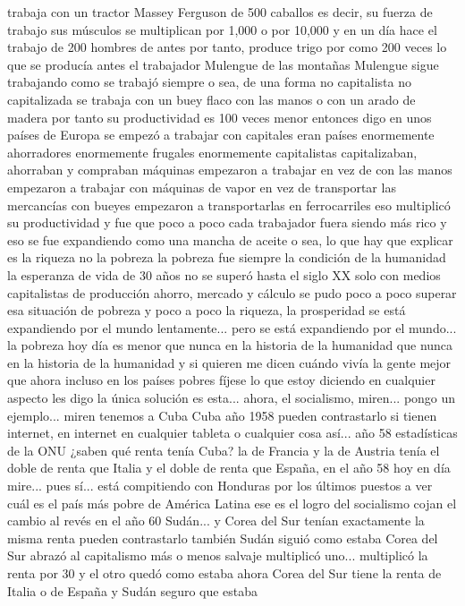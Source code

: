trabaja con un tractor Massey Ferguson de 500 caballos es decir, su fuerza de trabajo
sus músculos se multiplican por 1,000 o por 10,000 y en un día hace el trabajo de 200 hombres de antes
por tanto, produce trigo por como 200 veces lo que se producía antes el trabajador Mulengue de las montañas Mulengue
sigue trabajando como se trabajó siempre o sea, de una forma no capitalista no capitalizada se trabaja con un buey flaco
con las manos o con un arado de madera por tanto su productividad es 100 veces menor entonces digo
en unos países de Europa se empezó a trabajar con capitales eran países enormemente ahorradores enormemente frugales
enormemente capitalistas capitalizaban, ahorraban y compraban máquinas empezaron a trabajar en vez de con las manos
empezaron a trabajar con máquinas de vapor en vez de transportar las mercancías con bueyes empezaron a transportarlas en ferrocarriles
eso multiplicó su productividad y fue que poco a poco cada trabajador fuera siendo más rico
y eso se fue expandiendo como una mancha de aceite o sea, lo que hay que explicar es la riqueza
no la pobreza la pobreza fue siempre la condición de la humanidad la esperanza de vida de 30 años
no se superó hasta el siglo XX solo con medios capitalistas de producción
ahorro, mercado y cálculo se pudo poco a poco superar esa situación de pobreza
y poco a poco la riqueza, la prosperidad se está expandiendo por el mundo lentamente... pero se está expandiendo por el mundo...
la pobreza hoy día es menor que nunca en la historia de la humanidad que nunca en la historia de la humanidad y si quieren me dicen cuándo vivía la gente mejor que ahora
incluso en los países pobres fíjese lo que estoy diciendo en cualquier aspecto les digo la única solución es esta...
ahora, el socialismo, miren... pongo un ejemplo... miren tenemos a Cuba Cuba año 1958
pueden contrastarlo si tienen internet, en internet en cualquier tableta o cualquier cosa así... año 58 estadísticas de la ONU
¿saben qué renta tenía Cuba? la de Francia y la de Austria
tenía el doble de renta que Italia y el doble de renta que España, en el año 58 hoy en día mire... pues sí...
está compitiendo con Honduras por los últimos puestos a ver cuál es el país más pobre de América Latina ese es el logro del socialismo
cojan el cambio al revés en el año 60 Sudán... y Corea del Sur
tenían exactamente la misma renta pueden contrastarlo también
Sudán siguió como estaba Corea del Sur abrazó al capitalismo más o menos salvaje multiplicó uno...
multiplicó la renta por 30 y el otro quedó como estaba ahora Corea del Sur tiene la renta de Italia o de España y Sudán seguro que estaba
